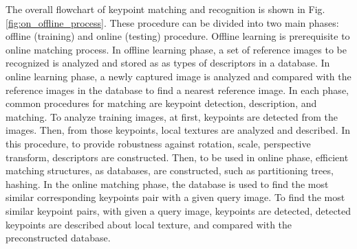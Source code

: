 
The overall flowchart of keypoint matching and recognition is shown in Fig. \ref{fig:on_offline_process}. These procedure can be divided into two main phases: offline (training) and online (testing) procedure. Offline learning is prerequisite to online matching process. In offline learning phase, a set of reference images to be recognized is analyzed and stored as as types of descriptors in a database. In online learning phase, a newly captured image is analyzed and compared with the reference images in the database to find a nearest reference image. In each phase, common procedures for matching are keypoint detection, description, and matching. To analyze training images, at first, keypoints are detected from the images. Then, from those keypoints, local textures are analyzed and described. In this procedure, to provide robustness against rotation, scale, perspective transform, descriptors are constructed. Then, to be used in online phase, efficient matching structures, as databases, are constructed, such as partitioning trees\cite{arya_optimal_1998,beis_shape_1997,muja_fast_2012}, hashing\cite{salakhutdinov_semantic_2009,gionis_similarity_1999,lv_multi-probe_2007}. In the online matching phase, the database is used to find the most similar corresponding keypoints pair with a given query image. To find the most similar keypoint pairs, with given a query image, keypoints are detected, detected keypoints are described about local texture, and compared with the preconstructed database.

